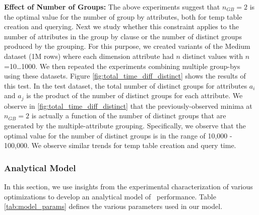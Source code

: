 {\bf Effect of Number of Groups:} The above experiments suggest that $n_{GB}=2$
is the optimal value for the number of group by attributes, both for temp table
creation and querying.
Next we study whether this constraint applies to the number of attributes in the
group by clause or the number of distinct groups produced by the grouping. For
this purpose, we created variants of the Medium dataset (1M rows) where each
dimension attribute had $n$ distinct values with $n$=10\ldots1000. We then
repeated the experiments combining multiple group-bys using these datasets.
Figure \ref{fig:total_time_diff_distinct} shows the results of this test. In the
test dataset, the total number of distinct groups for attributes $a_i$ and $a_j$
is the product of the number of distinct groups for each attribute. We observe
in \ref{fig:total_time_diff_distinct} that the previously-observed minima at
$n_{GB}=2$ is actually a function of the number of distinct groups that are
generated by the multiple-attribute grouping.
Specifically, we observe that the optimal value for the number of distinct
groups is in the range of 10,000 - 100,000. We observe similar trends for temp
table creation and query time.



\subsubsection{Analytical Model}
\label{sec:model}
In this section, we use insights from the experimental characterization of
various optimizations to develop an analytical model of \VizRecDB\ performance.
Table \ref{tab:model_params} defines the various parameters used in our model.

